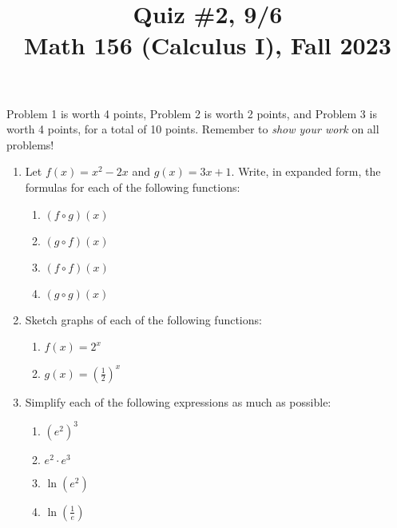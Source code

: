 \documentclass[11pt]{article}
\title{Quiz \#2, 9/6 \\ Math 156 (Calculus I), Fall 2023}
\date{}
\begin{document}
\maketitle

\thispagestyle{empty}

\vspace{-2cm}

Problem 1 is worth 4 points, Problem 2 is worth 2 points, and Problem 3 is worth 4 points, for a total of 10 points. Remember to \emph{show your work} on all problems!

\begin{enumerate}
\item Let $f(x) = x^2-2x$ and $g(x) = 3x+1$. Write, in expanded form, the formulas for each of the following functions:
\begin{multicols}{2}
\begin{enumerate}
\item $(f\circ g)(x)$
\item $(g\circ f)(x)$
\item $(f\circ f)(x)$
\item $(g\circ g)(x)$
\end{enumerate}
\end{multicols}

\vspace{4.5cm}

\item Sketch graphs of each of the following functions:
\begin{multicols}{2}
\begin{enumerate}
\item $f(x) = 2^x$
\item $g(x) = (\frac{1}{2})^x$
\end{enumerate}
\end{multicols}

\vspace{5cm}

\item Simplify each of the following expressions as much as possible:
\begin{multicols}{2}
\begin{enumerate}
\item $(e^2)^3$
\item $e^2 \cdot e^3$
\item $\ln(e^2)$
\item $\ln(\frac{1}{e})$
\end{enumerate}
\end{multicols}

\end{enumerate}
\end{document}
